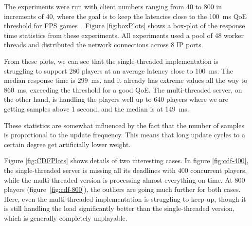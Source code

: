\begin{figure*}[!t!] 
  \centering
  \caption{Response time for single- and multi-threaded servers
 (dotted line is the 100~ms threshold). }
  \label{fig:boxPlots}
\end{figure*}

The experiments were run with client numbers ranging from 40 to 800 in
increments of 40, where the goal is to keep the latencies close to the
100~ms QoE threshold for FPS games~\cite{claypool++-2006}. Figure
\ref{fig:boxPlots} shows a box-plot of the response time statistics
from these experiments. All experiments used a pool of 48 worker
threads and distributed the network connections across 8 IP ports.

From these plots, we can see that the single-threaded implementation
is struggling to support 280 players at an average latency close to
100~ms. The median response time is 299~ms, and it already has
extreme values all the way to 860~ms, exceeding the threshold for a good
QoE. The multi-threaded server, on the other hand, is handling the
players well up to 640 players where we are getting samples above 1
second, and the median is at 149~ms.

These statistics are somewhat influenced by the fact that the number of
samples is proportional to the update frequency. This means that long
update cycles to a certain degree get artificially lower weight.

\begin{figure*}[ht]
  \centering 
  \caption{CDF of response time for single-  and multi-threaded
    servers with 400 and 800 concurrent clients.}
  \label{fig:CDFPlots}
\end{figure*}

Figure \ref{fig:CDFPlots} shows details of two interesting cases. In
figure \ref{fig:cdf-400}, the single-threaded server is missing all
its deadlines with 400 concurrent players, while the multi-threaded
version is processing almost everything on time. At 800 players
(figure~\ref{fig:cdf-800}), the outliers are going much further for
both cases. Here, even the multi-threaded implementation is struggling
to keep up, though it is still handling the load significantly better
than the single-threaded version, which is generally completely
unplayable.
